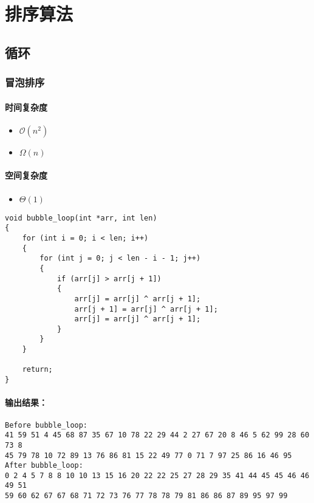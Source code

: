 \documentclass[UTF8]{ctexart}
\title{\heiti{作业1：算法分析与复杂度}}
\author{宋雨桐}
\date{\today}
\begin{document}
\maketitle
\section{排序算法}
\subsection{循环}
\subsubsection{冒泡排序}
\paragraph{时间复杂度}
\begin{itemize}
    \item $\mathcal{O}(n^2)$
    \item $\Omega(n)$
\end{itemize}
\paragraph{空间复杂度}
\begin{itemize}
	\item $\Theta(1)$
\end{itemize}
\begin{lstlisting}
void bubble_loop(int *arr, int len)
{
	for (int i = 0; i < len; i++)
	{
		for (int j = 0; j < len - i - 1; j++)
		{
			if (arr[j] > arr[j + 1])
			{
				arr[j] = arr[j] ^ arr[j + 1];
				arr[j + 1] = arr[j] ^ arr[j + 1];
				arr[j] = arr[j] ^ arr[j + 1];
			}
		}
	}	

	return;
}
\end{lstlisting}
\paragraph{输出结果：}
\begin{lstlisting}
Before bubble_loop:
41 59 51 4 45 68 87 35 67 10 78 22 29 44 2 27 67 20 8 46 5 62 99 28 60 73 8 
45 79 78 10 72 89 13 76 86 81 15 22 49 77 0 71 7 97 25 86 16 46 95 
After bubble_loop:
0 2 4 5 7 8 8 10 10 13 15 16 20 22 22 25 27 28 29 35 41 44 45 45 46 46 49 51 
59 60 62 67 67 68 71 72 73 76 77 78 78 79 81 86 86 87 89 95 97 99
\end{lstlisting}
\end{document}
